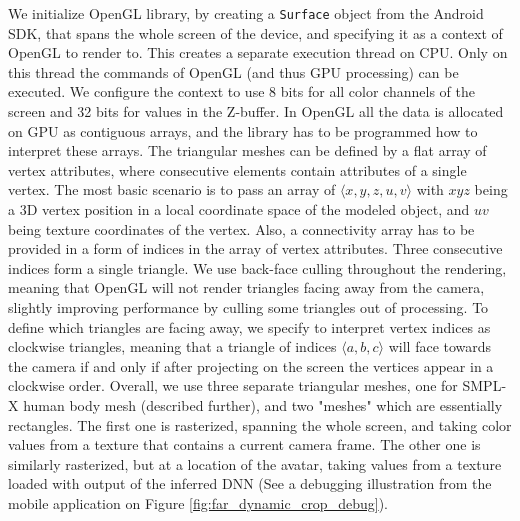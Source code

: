 We initialize OpenGL library, by creating a \verb|Surface| object from the Android SDK, that spans the whole screen of the device, and specifying it as a context of OpenGL to render to. This creates a separate execution thread on CPU. Only on this thread the commands of OpenGL (and thus GPU processing) can be executed. We configure the context to use 8 bits for all color channels of the screen and 32 bits for values in the Z-buffer. In OpenGL all the data is allocated on GPU as contiguous arrays, and the library has to be programmed how to interpret these arrays. The triangular meshes can be defined by a flat array of vertex attributes, where consecutive elements contain attributes of a single vertex. The most basic scenario is to pass an array of $\langle x, y, z, u, v\rangle$ with $xyz$ being a 3D vertex position in a local coordinate space of the modeled object, and $uv$ being texture coordinates of the vertex. Also, a connectivity array has to be provided in a form of indices in the array of vertex attributes. Three consecutive indices form a single triangle. We use back-face culling throughout the rendering, meaning that OpenGL will not render triangles facing away from the camera, slightly improving performance by culling some triangles out of processing. To define which triangles are facing away, we specify to interpret vertex indices as clockwise triangles, meaning that a triangle of indices $\langle a, b, c\rangle$ will face towards the camera if and only if after projecting on the screen the vertices appear in a clockwise order. Overall, we use three separate triangular meshes, one for SMPL-X human body mesh (described further), and two "meshes" which are essentially rectangles. The first one is rasterized, spanning the whole screen, and taking color values from a texture that contains a current camera frame. The other one is similarly rasterized, but at a location of the avatar, taking values from a texture loaded with output of the inferred DNN (See a debugging illustration from the mobile application on Figure \ref{fig:far_dynamic_crop_debug}).

